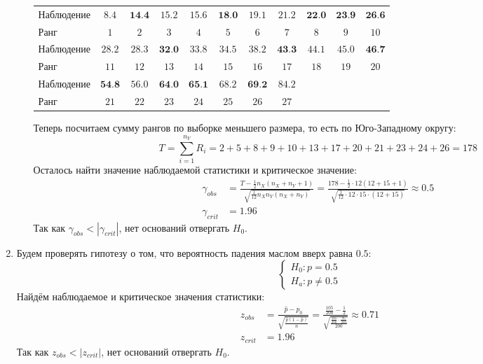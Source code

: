 \begin{enumerate}
\begin{enumerate}
\begin{center}
\begin{tabular}{@{}lcccccccccc@{}}
\toprule
Наблюдение & $8.4$           & $\textbf{14.4}$ & $15.2$          & $15.6$          & $\textbf{18.0}$ & $19.1$          & $21.2$          & $\textbf{22.0}$ & $\textbf{23.9}$ & $\textbf{26.6}$ \\
Ранг       & $1$             & $2$             & $3$             & $4$             & $5$             & $6$             & $7$             & $8$             & $9$             & $10$            \\ \midrule
Наблюдение & $28.2$          & $28.3$          & $\textbf{32.0}$ & $33.8$          & $34.5$          & $38.2$          & $\textbf{43.3}$ & $44.1$          & $45.0$          & $\textbf{46.7}$ \\
Ранг       & $11$            & $12$            & $13$            & $14$            & $15$            & $16$            & $17$            & $18$            & $19$            & $20$            \\ \midrule
Наблюдение & $\textbf{54.8}$ & $56.0$          & $\textbf{64.0}$ & $\textbf{65.1}$ & $68.2$          & $\textbf{69.2}$ & $84.2$ \\
Ранг       & $21$            & $22$            & $23$            & $24$            & $25$            & $26$            & $27$   \\ \bottomrule
\end{tabular}
\end{center}

Теперь посчитаем сумму рангов по выборке меньшего размера, то есть по Юго-Западному округу:
\[
T = \sum_{i=1}^{n_Y} R_i = 2 + 5 + 8 + 9 + 10 + 13 + 17 + 20 + 21 + 23 + 24 + 26 = 178
\]
Осталось найти значение наблюдаемой статистики и критическое значение:
\begin{align*}
\gamma_{obs} &= \frac{T - \frac{1}{2} n_X (n_X + n_Y + 1)}{\sqrt{\frac{1}{12} n_X n_Y (n_X + n_Y)} } = \frac{178 - \frac{1}{2} \cdot 12 (12 + 15 + 1)}{\sqrt{\frac{1}{12} \cdot 12 \cdot 15 \cdot(12 + 15)}} \approx 0.5 \\
\gamma_{crit} &= 1.96
\end{align*}
Так как $\gamma_{obs} < |\gamma_{crit}|$, нет оснований отвергать $H_0$.
\end{enumerate}
\item Будем проверять гипотезу о том, что вероятность падения маслом вверх равна $0.5$:
\[
\begin{cases}
H_0: p = 0.5 \\
H_a: p \neq 0.5
\end{cases}
\]
Найдём наблюдаемое и критическое значения статистики:
\begin{align*}
z_{obs} &= \frac{\hat p - p_0}{\sqrt{\frac{\hat p (1 - \hat p)}{n}}} = \frac{\frac{105}{200} - \frac{1}{2}}{\sqrt{\frac{\frac{105}{200} \cdot \frac{95}{200}}{200}}} \approx 0.71 \\
z_{crit} &= 1.96
\end{align*}
Так как $z_{obs} < |z_{crit}|$, нет оснований отвергать $H_0$.


\end{enumerate}
